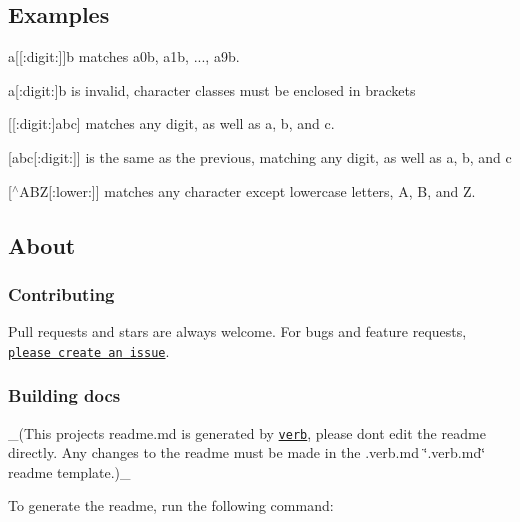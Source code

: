 \subsection*{Examples}


\begin{DoxyItemize}
\item {\ttfamily a\mbox{[}\mbox{[}\+:digit\+:\mbox{]}\mbox{]}b} matches {\ttfamily a0b}, {\ttfamily a1b}, ..., {\ttfamily a9b}.
\item {\ttfamily a\mbox{[}\+:digit\+:\mbox{]}b} is invalid, character classes must be enclosed in brackets
\item {\ttfamily \mbox{[}\mbox{[}\+:digit\+:\mbox{]}abc\mbox{]}} matches any digit, as well as {\ttfamily a}, {\ttfamily b}, and {\ttfamily c}.
\item {\ttfamily \mbox{[}abc\mbox{[}\+:digit\+:\mbox{]}\mbox{]}} is the same as the previous, matching any digit, as well as {\ttfamily a}, {\ttfamily b}, and {\ttfamily c}
\item {\ttfamily \mbox{[}$^\wedge$\+A\+BZ\mbox{[}\+:lower\+:\mbox{]}\mbox{]}} matches any character except lowercase letters, {\ttfamily A}, {\ttfamily B}, and {\ttfamily Z}.
\end{DoxyItemize}

\subsection*{About}

\subsubsection*{Contributing}

Pull requests and stars are always welcome. For bugs and feature requests, \href{../../issues/new}{\tt please create an issue}.

\subsubsection*{Building docs}

\+\_\+(This project\textquotesingle{}s readme.\+md is generated by \href{https://github.com/verbose/verb-generate-readme}{\tt verb}, please don\textquotesingle{}t edit the readme directly. Any changes to the readme must be made in the .verb.\+md \char`\"{}.\+verb.\+md\char`\"{} readme template.)\+\_\+

To generate the readme, run the following command\+:



